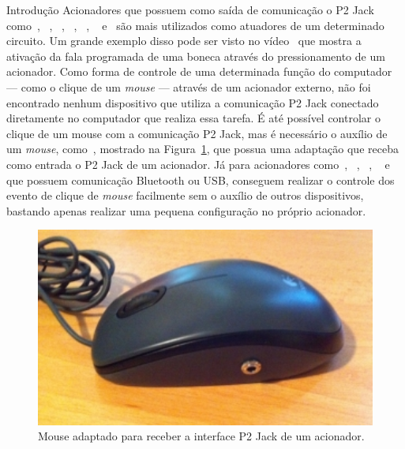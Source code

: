 \begin{chapter}{Introdução}
Acionadores que possuem como saída de comunicação o P2 Jack
como~\cite{CandyCorn}, ~\cite{PalPad}, ~\cite{JellyBean}, ~\cite{Chin}, ~\cite{
MicroLight}, ~\cite{HoneyBee} e~\cite{StringSwitch} são mais utilizados como
atuadores de um determinado circuito. Um grande exemplo disso pode ser visto no
vídeo~\cite{ATswitchYT} que mostra a ativação da fala programada de uma boneca
através do pressionamento de um acionador. Como forma de controle de uma
determinada função do computador --- como o clique de um \textit{mouse} ---
através de um acionador externo, não foi encontrado nenhum dispositivo que
utiliza a comunicação P2 Jack conectado diretamente no computador que
realiza essa tarefa. É até possível controlar o clique de um mouse com a
comunicação P2 Jack, mas é necessário o auxílio de um \textit{mouse},
como~\cite{MouseJack}, mostrado na Figura~\ref{fig:mouse}, que possua uma
adaptação que receba como entrada o P2 Jack de um acionador. Já para
acionadores como~\cite{Blue2}, ~\cite{SavantElite2}, ~\cite{FootPedal},
~\cite{FootSwitch} e ~\cite{SipPuff} que possuem comunicação Bluetooth ou USB, 
conseguem realizar o controle dos evento de
clique de \textit{mouse} facilmente sem o auxílio de outros dispositivos,
bastando apenas realizar uma pequena configuração no próprio acionador.

\begin{figure}[!h]
	\centering
	\includegraphics[width=1.0\textwidth]{fig/mouse13}
	\caption{Mouse adaptado para receber a interface P2 Jack de um acionador.}
	\label{fig:mouse}
\end{figure}


\end{chapter}
